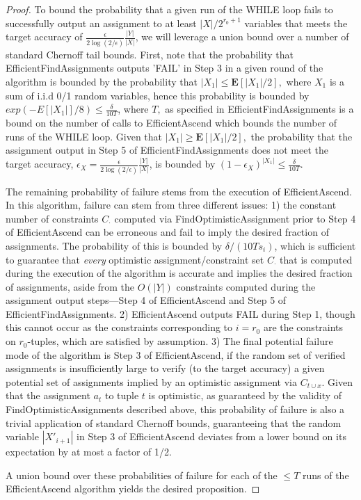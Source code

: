 \documentclass[final,12pt]{colt2018}
\newcommand{\eps}{\epsilon}
\newcommand{\E}{\textbf{E}}
\begin{document}
\begin{proof}
To bound the probability that a given run of the WHILE loop fails to successfully output an assignment to at least $|X|/2^{r_0+1}$ variables that meets the target accuracy of $\frac{\eps}{2 \log(2/\eps)}\frac{|Y|}{|X|}$, we will leverage a union bound over a number of standard Chernoff tail bounds.   First, note that the probability that EfficientFindAssignments outputs 'FAIL' in Step 3 in a given round of the algorithm is bounded by the probability that $|X_1| \le \E[|X_1|/2],$ where $X_1$ is a sum of i.i.d 0/1 random variables, hence this probability is bounded by $exp(-E[|X_1|]/8) \le \frac{\delta}{10 T}$, where $T,$ as specified in EfficientFindAssignments is a bound on the number of calls to EfficientAscend which bounds the number of runs of the WHILE loop.  Given that $|X_1| \ge \E[|X_1|/2],$ the probability that the assignment output in Step 5 of EfficientFindAssignments does not meet the target accuracy, $\eps_X=\frac{\eps}{2 \log(2/\eps)}\frac{|Y|}{|X|}$, is bounded by $(1-\eps_X)^{|X_1|} \le \frac{\delta}{10 T}.$  

The remaining  probability of failure stems from the execution of EfficientAscend.  In this algorithm, failure can stem from three different issues:  1) the constant number of constraints $C_{\cdot}$ computed via FindOptimisticAssignment prior to Step 4 of EfficientAscend can be erroneous and fail to imply the desired fraction of assignments.  The probability of this is bounded by $\delta/(10T s_i)$, which is sufficient to guarantee that \emph{every} optimistic assignment/constraint set $C_{\cdot}$ that is computed during the execution of the algorithm is accurate and implies the desired fraction of assignments, aside from the $O(|Y|)$ constraints computed during the assignment output steps---Step 4 of EfficientAscend and Step 5 of EfficientFindAssignments.   2) EfficientAscend outputs FAIL during Step 1, though this cannot occur as the constraints corresponding to  $i=r_0$ are the constraints on $r_0$-tuples, which are satisfied by assumption.   3) The final potential failure mode of the algorithm is Step 3 of EfficientAscend, if the random set of verified assignments is insufficiently large to verify (to the target accuracy) a given potential set of assignments implied by an optimistic assignment via $C_{t \cup x}$.  Given that the assignment $a_t$ to tuple $t$ is optimistic, as guaranteed by the validity of FindOptimisticAssignments described above, this probability of failure is also a trivial application of standard Chernoff bounds, guaranteeing that the random variable $|X'_{i+1}|$ in Step 3 of EfficientAscend deviates from a lower bound on its expectation by at most a factor of 1/2.

A union bound over these probabilities of failure for each of the $\le T$ runs of the EfficientAscend algorithm yields the desired proposition.
\end{proof}
\end{document}

